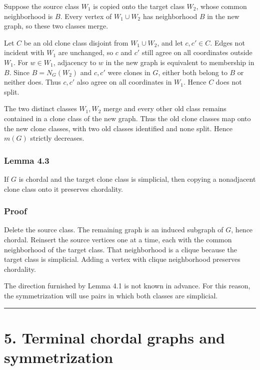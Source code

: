 \documentclass[
  11pt,
]{article}
\begin{document}
Suppose the source class \(W_1\) is copied onto the target class
\(W_2\), whose common neighborhood is \(B\). Every vertex of
\(W_1\cup W_2\) has neighborhood \(B\) in the new graph, so these two
classes merge.

Let \(C\) be an old clone class disjoint from \(W_1\cup W_2\), and let
\(c,c'\in C\). Edges not incident with \(W_1\) are unchanged, so \(c\)
and \(c'\) still agree on all coordinates outside \(W_1\). For
\(w\in W_1\), adjacency to \(w\) in the new graph is equivalent to
membership in \(B\). Since \(B=N_G(W_2)\) and \(c,c'\) were clones in
\(G\), either both belong to \(B\) or neither does. Thus \(c,c'\) also
agree on all coordinates in \(W_1\). Hence \(C\) does not split.

The two distinct classes \(W_1,W_2\) merge and every other old class
remains contained in a clone class of the new graph. Thus the old clone
classes map onto the new clone classes, with two old classes identified
and none split. Hence \(m(G)\) strictly decreases.

\subsubsection{Lemma 4.3}\label{lemma-4.3}

If \(G\) is chordal and the target clone class is simplicial, then
copying a nonadjacent clone class onto it preserves chordality.

\subsubsection{Proof}\label{proof-4}

Delete the source class. The remaining graph is an induced subgraph of
\(G\), hence chordal. Reinsert the source vertices one at a time, each
with the common neighborhood of the target class. That neighborhood is a
clique because the target class is simplicial. Adding a vertex with
clique neighborhood preserves chordality.

The direction furnished by Lemma 4.1 is not known in advance. For this
reason, the symmetrization will use pairs in which both classes are
simplicial.

\begin{center}\rule{0.5\linewidth}{0.5pt}\end{center}

\section{5. Terminal chordal graphs and
symmetrization}\label{terminal-chordal-graphs-and-symmetrization}
\end{document}
